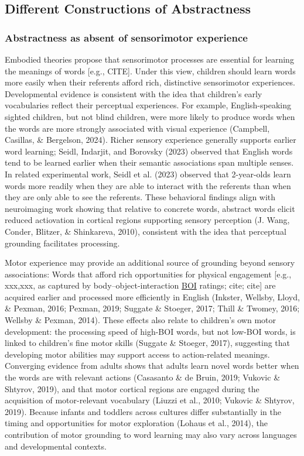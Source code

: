 \documentclass[
  man,floatsintext]{apa6}
\begin{document}
\subsection{Different Constructions of Abstractness}\label{different-constructions-of-abstractness}

\subsubsection{Abstractness as absent of sensorimotor experience}\label{abstractness-as-absent-of-sensorimotor-experience}

Embodied theories propose that sensorimotor processes are essential for learning the meanings of words {[}e.g., CITE{]}. Under this view, children should learn words more easily when their referents afford rich, distinctive sensorimotor experiences. Developmental evidence is consistent with the idea that children's early vocabularies reflect their perceptual experiences. For example, English-speaking sighted children, but not blind children, were more likely to produce words when the words are more strongly associated with visual experience (Campbell, Casillas, \& Bergelson, 2024). Richer sensory experience generally supports earlier word learning; Seidl, Indarjit, and Borovsky (2023) observed that English words tend to be learned earlier when their semantic associations span multiple senses. In related experimental work, Seidl et al. (2023) observed that 2-year-olds learn words more readily when they are able to interact with the referents than when they are only able to see the referents. These behavioral findings align with neuroimaging work showing that relative to concrete words, abstract words elicit reduced actiovation in cortical regions supporting sensory perception (J. Wang, Conder, Blitzer, \& Shinkareva, 2010), consistent with the idea that perceptual grounding facilitates processing.

Motor experience may provide an additional source of grounding beyond sensory associations: Words that afford rich opportunities for physical engagement {[}e.g., xxx,xxx, as captured by body--object-interaction \hyperref[boi]{BOI} ratings; cite; cite{]} are acquired earlier and processed more efficiently in English (Inkster, Wellsby, Lloyd, \& Pexman, 2016; Pexman, 2019; Suggate \& Stoeger, 2017; Thill \& Twomey, 2016; Wellsby \& Pexman, 2014). These effects also relate to children's own motor development: the processing speed of high-BOI words, but not low-BOI words, is linked to children's fine motor skills (Suggate \& Stoeger, 2017), suggesting that developing motor abilities may support access to action-related meanings. Converging evidence from adults shows that adults learn novel words better when the words are with relevant actions (Casasanto \& de Bruin, 2019; Vukovic \& Shtyrov, 2019), and that motor cortical regions are engaged during the acquisition of motor-relevant vocabulary (Liuzzi et al., 2010; Vukovic \& Shtyrov, 2019). Because infants and toddlers across cultures differ substantially in the timing and opportunities for motor exploration (Lohaus et al., 2014), the contribution of motor grounding to word learning may also vary across languages and developmental contexts.
\end{document}
